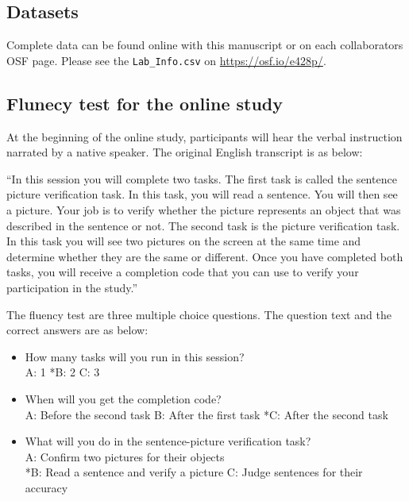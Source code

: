 \documentclass[
  man,floatsintext]{apa7}
\begin{document}
\hypertarget{datasets}{%
\subsection{Datasets}\label{datasets}}

Complete data can be found online with this manuscript or on each collaborators OSF page. Please see the \texttt{Lab\_Info.csv} on \url{https://osf.io/e428p/}.

\hypertarget{flunecy-test-for-the-online-study}{%
\subsection{Flunecy test for the online study}\label{flunecy-test-for-the-online-study}}

At the beginning of the online study, participants will hear the verbal instruction narrated by a native speaker. The original English transcript is as below:

``In this session you will complete two tasks. The first task is called the sentence picture verification task. In this task, you will read a sentence. You will then see a picture. Your job is to verify whether the picture represents an object that was described in the sentence or not. The second task is the picture verification task. In this task you will see two pictures on the screen at the same time and determine whether they are the same or different. Once you have completed both tasks, you will receive a completion code that you can use to verify your participation in the study.''

The fluency test are three multiple choice questions. The question text and the correct answers are as below:

\begin{itemize}
\item
  How many tasks will you run in this session?\\
  A: 1
  *B: 2
  C: 3
\item
  When will you get the completion code?\\
  A: Before the second task
  B: After the first task
  *C: After the second task
\item
  What will you do in the sentence-picture verification task?\\
  A: Confirm two pictures for their objects\\
  *B: Read a sentence and verify a picture
  C: Judge sentences for their accuracy
\end{itemize}
\end{document}
